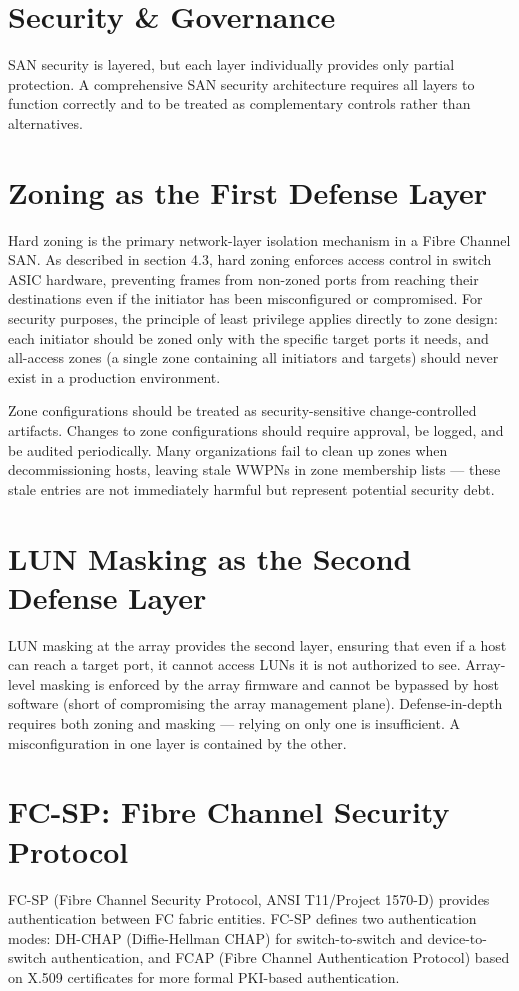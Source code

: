 \section{Security \& Governance}
SAN security is layered, but each layer individually provides only partial protection. A comprehensive SAN security architecture requires all layers to function correctly and to be treated as complementary controls rather than alternatives.

\section{Zoning as the First Defense Layer}
Hard zoning is the primary network-layer isolation mechanism in a Fibre Channel SAN. As described in section 4.3, hard zoning enforces access control in switch ASIC hardware, preventing frames from non-zoned ports from reaching their destinations even if the initiator has been misconfigured or compromised. For security purposes, the principle of least privilege applies directly to zone design: each initiator should be zoned only with the specific target ports it needs, and all-access zones (a single zone containing all initiators and targets) should never exist in a production environment.

Zone configurations should be treated as security-sensitive change-controlled artifacts. Changes to zone configurations should require approval, be logged, and be audited periodically. Many organizations fail to clean up zones when decommissioning hosts, leaving stale WWPNs in zone membership lists --- these stale entries are not immediately harmful but represent potential security debt.

\section{LUN Masking as the Second Defense Layer}
LUN masking at the array provides the second layer, ensuring that even if a host can reach a target port, it cannot access LUNs it is not authorized to see. Array-level masking is enforced by the array firmware and cannot be bypassed by host software (short of compromising the array management plane). Defense-in-depth requires both zoning and masking --- relying on only one is insufficient. A misconfiguration in one layer is contained by the other.

\section{FC-SP: Fibre Channel Security Protocol}
FC-SP (Fibre Channel Security Protocol, ANSI T11/Project 1570-D) provides authentication between FC fabric entities. FC-SP defines two authentication modes: DH-CHAP (Diffie-Hellman CHAP) for switch-to-switch and device-to-switch authentication, and FCAP (Fibre Channel Authentication Protocol) based on X.509 certificates for more formal PKI-based authentication.


